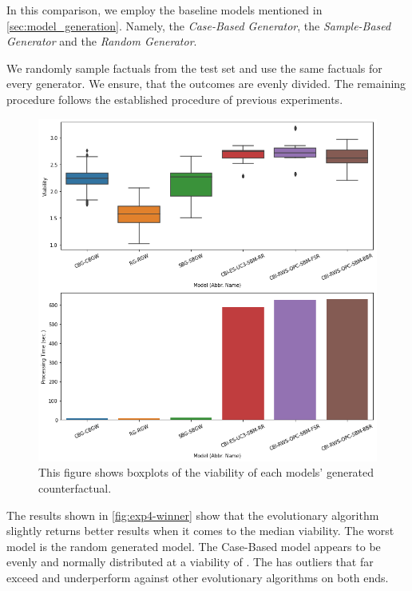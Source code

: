 \documentclass[./../../paper.tex]{subfiles}
\begin{document}
In this comparison, we employ the baseline models mentioned in \autoref{sec:model_generation}. Namely, the \emph{Case-Based Generator}, the \emph{Sample-Based Generator} and the \emph{Random Generator}. 

We randomly sample  factuals from the test set and use the same factuals for every generator. We ensure, that the outcomes are evenly divided. The remaining procedure follows the established procedure of previous experiments.

\begin{figure}[htbp]
    \centering
    \includegraphics[width=\textwidth]{figures/generated/exp4_winner_overall.png}
    \caption{This figure shows boxplots of the viability of each models' generated counterfactual.}
    \label{fig:exp4-winner}
\end{figure}

\noindent The results shown in \autoref{fig:exp4-winner} show that the evolutionary algorithm  slightly returns better results when it comes to the median viability. The worst model is the random generated model. The Case-Based model appears to be evenly and normally distributed at a viability of . The  has outliers that far exceed and underperform against other evolutionary algorithms on both ends.  
\end{document}
